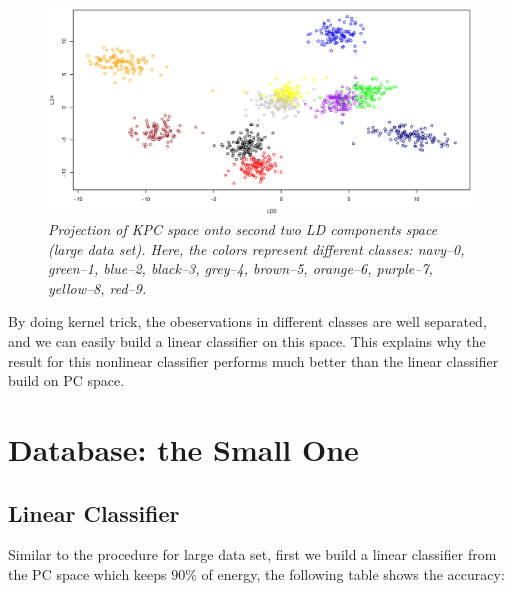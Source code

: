 \documentclass{article}
\begin{document}
\begin{figure}[htp]
\centering
\includegraphics[width=12.1cm]{large_kpcalda_LD34_train.eps}
\caption{\textit{Projection of KPC space onto second two LD components space (large data set). Here, the colors represent different classes: navy--0, green--1, 
blue--2, black--3, grey--4, brown--5, orange--6, purple--7, yellow--8, red--9.}}
\end{figure}

By doing kernel trick, the obeservations in different classes are well separated, and we can easily build a linear classifier on this space.
This explains why the result for this nonlinear classifier performs much better than the linear classifier build on PC space.

\goodbreak

\section{Database: the Small One}

\subsection{Linear Classifier}

Similar to the procedure for large data set, first we build a linear classifier from the PC space which keeps $90\%$ of energy, the following table
shows the accuracy:
\end{document}
